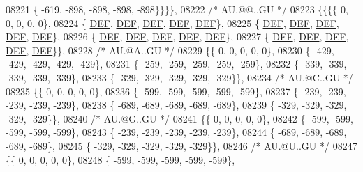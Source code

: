 \begin{DoxyCode}
08221 \{ -619, -898, -898, -898, -898\}\}\}\},
08222 \textcolor{comment}{/* AU.@@..GU */}
08223 \{\{\{\{    0,    0,    0,    0,    0\},
08224 \{  \mbox{\hyperlink{1_88_84__epars_8h_a397419fc12b37ed479c8abb9d444d843}{DEF}},  \mbox{\hyperlink{1_88_84__epars_8h_a397419fc12b37ed479c8abb9d444d843}{DEF}},  \mbox{\hyperlink{1_88_84__epars_8h_a397419fc12b37ed479c8abb9d444d843}{DEF}},  \mbox{\hyperlink{1_88_84__epars_8h_a397419fc12b37ed479c8abb9d444d843}{DEF}},  \mbox{\hyperlink{1_88_84__epars_8h_a397419fc12b37ed479c8abb9d444d843}{DEF}}\},
08225 \{  \mbox{\hyperlink{1_88_84__epars_8h_a397419fc12b37ed479c8abb9d444d843}{DEF}},  \mbox{\hyperlink{1_88_84__epars_8h_a397419fc12b37ed479c8abb9d444d843}{DEF}},  \mbox{\hyperlink{1_88_84__epars_8h_a397419fc12b37ed479c8abb9d444d843}{DEF}},  \mbox{\hyperlink{1_88_84__epars_8h_a397419fc12b37ed479c8abb9d444d843}{DEF}},  \mbox{\hyperlink{1_88_84__epars_8h_a397419fc12b37ed479c8abb9d444d843}{DEF}}\},
08226 \{  \mbox{\hyperlink{1_88_84__epars_8h_a397419fc12b37ed479c8abb9d444d843}{DEF}},  \mbox{\hyperlink{1_88_84__epars_8h_a397419fc12b37ed479c8abb9d444d843}{DEF}},  \mbox{\hyperlink{1_88_84__epars_8h_a397419fc12b37ed479c8abb9d444d843}{DEF}},  \mbox{\hyperlink{1_88_84__epars_8h_a397419fc12b37ed479c8abb9d444d843}{DEF}},  \mbox{\hyperlink{1_88_84__epars_8h_a397419fc12b37ed479c8abb9d444d843}{DEF}}\},
08227 \{  \mbox{\hyperlink{1_88_84__epars_8h_a397419fc12b37ed479c8abb9d444d843}{DEF}},  \mbox{\hyperlink{1_88_84__epars_8h_a397419fc12b37ed479c8abb9d444d843}{DEF}},  \mbox{\hyperlink{1_88_84__epars_8h_a397419fc12b37ed479c8abb9d444d843}{DEF}},  \mbox{\hyperlink{1_88_84__epars_8h_a397419fc12b37ed479c8abb9d444d843}{DEF}},  \mbox{\hyperlink{1_88_84__epars_8h_a397419fc12b37ed479c8abb9d444d843}{DEF}}\}\},
08228 \textcolor{comment}{/* AU.@A..GU */}
08229 \{\{    0,    0,    0,    0,    0\},
08230 \{ -429, -429, -429, -429, -429\},
08231 \{ -259, -259, -259, -259, -259\},
08232 \{ -339, -339, -339, -339, -339\},
08233 \{ -329, -329, -329, -329, -329\}\},
08234 \textcolor{comment}{/* AU.@C..GU */}
08235 \{\{    0,    0,    0,    0,    0\},
08236 \{ -599, -599, -599, -599, -599\},
08237 \{ -239, -239, -239, -239, -239\},
08238 \{ -689, -689, -689, -689, -689\},
08239 \{ -329, -329, -329, -329, -329\}\},
08240 \textcolor{comment}{/* AU.@G..GU */}
08241 \{\{    0,    0,    0,    0,    0\},
08242 \{ -599, -599, -599, -599, -599\},
08243 \{ -239, -239, -239, -239, -239\},
08244 \{ -689, -689, -689, -689, -689\},
08245 \{ -329, -329, -329, -329, -329\}\},
08246 \textcolor{comment}{/* AU.@U..GU */}
08247 \{\{    0,    0,    0,    0,    0\},
08248 \{ -599, -599, -599, -599, -599\},

\end{DoxyCode}
